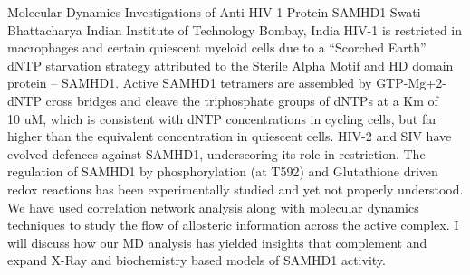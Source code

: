 
    \begin{abstract_online}{Molecular Dynamics Investigations of Anti HIV-1 Protein SAMHD1}{%
        Swati Bhattacharya}{%
        \IStag}{%
        Indian Institute of Technology Bombay, India}
    HIV-1 is restricted in macrophages and certain quiescent myeloid cells due to a “Scorched Earth” dNTP starvation strategy attributed to the Sterile Alpha Motif and HD domain protein – SAMHD1. Active SAMHD1 tetramers are assembled by GTP-Mg+2-dNTP cross bridges and cleave the triphosphate groups of dNTPs at a Km of ~ 10 uM, which is consistent with dNTP concentrations in cycling cells, but far higher than the equivalent concentration in quiescent cells. HIV-2 and SIV have evolved defences against SAMHD1, underscoring its role in restriction. The regulation of SAMHD1 by phosphorylation (at T592) and Glutathione driven redox reactions  has been experimentally studied and yet not properly understood. We have used correlation network analysis along with molecular dynamics techniques to study the flow of allosteric information across the active complex. I will discuss how our MD analysis has yielded insights that complement and expand X-Ray and biochemistry based models of SAMHD1 activity. 
    
    \end{abstract_online}
    